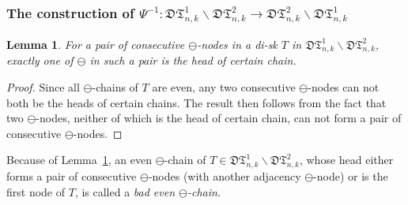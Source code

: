 \documentclass[12pt]{amsart}
\numberwithin{equation}{section}
\theoremstyle{plain}
\newtheorem{lemma}[theorem]{Lemma}
\theoremstyle{definition}
\def\D{\mathfrak{D}}
\def\T{\mathfrak{T}}
\begin{document}
\subsubsection{The construction of $\Psi^{-1}:\D\T^{1}_{n,k}\backslash \D\T^{2}_{n,k}\rightarrow\D\T^{2}_{n,k}\backslash \D\T^{1}_{n,k}$}%

\begin{lemma}\label{head}
For a pair of consecutive $\ominus$-nodes in a di-sk $T$ in $\D\T^{1}_{n,k}\backslash \D\T^{2}_{n,k}$, exactly one of $\ominus$ in such a pair is the head of certain chain.
\end{lemma}
\begin{proof}
Since all $\ominus$-chains of $T$ are even, any two consecutive $\ominus$-nodes can not both be the heads of certain chains. The result then follows from the fact that two $\ominus$-nodes, neither of which is the head of certain chain, can not form a pair of consecutive  $\ominus$-nodes.
\end{proof}

Because of Lemma~\ref{head}, an even $\ominus$-chain of  $T\in\D\T^{1}_{n,k}\backslash \D\T^{2}_{n,k}$, whose head either forms a pair of consecutive $\ominus$-nodes (with another adjacency $\ominus$-node) or is  the first node of $T$,  is called a {\em bad even $\ominus$-chain}. 
\end{document}
